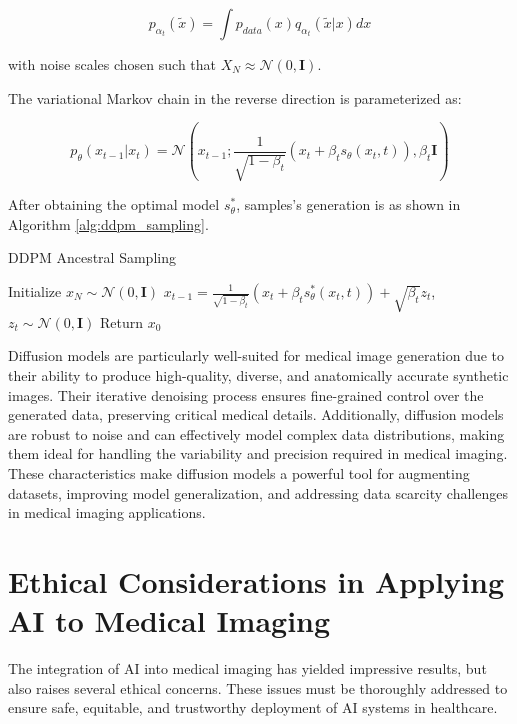 \documentclass{article}
\begin{document}
\begin{equation}
p_{\alpha_t}(\tilde{x}) = \int p_{data}(x)q_{\alpha_t}(\tilde{x}|x)dx
\end{equation}

with noise scales chosen such that $X_N \approx \mathcal{N}(0,\mathbf{I})$.

The variational Markov chain in the reverse direction is parameterized as:

\begin{equation}
p_\theta(x_{t-1}|x_t) = \mathcal{N}\left(x_{t-1}; \frac{1}{\sqrt{1-\beta_t}}(x_t + \beta_t s_\theta(x_t,t)), \beta_t\mathbf{I}\right)
\end{equation}

After obtaining the optimal model $s_\theta^*$, samples's generation is as shown in Algorithm \ref{alg:ddpm_sampling}. 

\begin{algorithm}[H]
\caption{DDPM Ancestral Sampling}
\label{alg:ddpm_sampling}
\begin{algorithmic}[1]
\STATE Initialize $x_N \sim \mathcal{N}(0,\mathbf{I})$
    \STATE $x_{t-1} = \frac{1}{\sqrt{1-\beta_t}}(x_t + \beta_t s_\theta^*(x_t,t)) + \sqrt{\beta_t}z_t$, $z_t \sim \mathcal{N}(0,\mathbf{I})$
\ENDFOR
\STATE Return $x_0$
\end{algorithmic}
\end{algorithm}

Diffusion models are particularly well-suited for medical image generation due to their ability to produce high-quality, diverse, and anatomically accurate synthetic images. Their iterative denoising process ensures fine-grained control over the generated data, preserving critical medical details. Additionally, diffusion models are robust to noise and can effectively model complex data distributions, making them ideal for handling the variability and precision required in medical imaging. These characteristics make diffusion models a powerful tool for augmenting datasets, improving model generalization, and addressing data scarcity challenges in medical imaging applications.



    







\section{Ethical Considerations in Applying AI to Medical Imaging}
\label{sec:ethical_implications}
The integration of AI into medical imaging has yielded impressive results, but also raises several ethical concerns. These issues must be thoroughly addressed to ensure safe, equitable, and trustworthy deployment of AI systems in healthcare.
\end{document}
